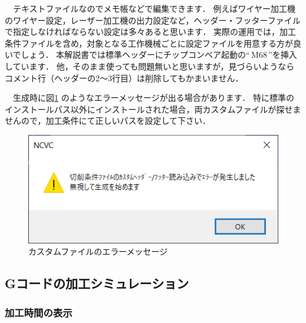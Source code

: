 \vspace*{2zh}
　テキストファイルなのでメモ帳などで編集できます．
例えばワイヤー加工機のワイヤー設定，レーザー加工機の出力設定など，ヘッダー・フッターファイルで指定しなければならない設定は多々あると思います．
実際の運用では，加工条件ファイルを含め，対象となる工作機械ごとに設定ファイルを用意する方が良いでしょう．
本解説書では標準ヘッダーにチップコンベア起動の``\,M68\,''を挿入しています．
他，そのまま使っても問題無いと思いますが，見づらいようならコメント行（ヘッダーの2～3行目）は削除してもかまいません．

　生成時に図\ref{fig:error.png} のようなエラーメッセージが出る場合があります．
特に標準のインストールパス以外にインストールされた場合，両カスタムファイルが探せませんので，加工条件にて正しいパスを設定して下さい．

\begin{figure}[H]
\centering
\includegraphics{No2/fig/error.png}
\caption{カスタムファイルのエラーメッセージ}
\label{fig:error.png}
\end{figure}

\subsection{Gコードの加工シミュレーション}
\label{sec:simulation}

\subsubsection{加工時間の表示}

